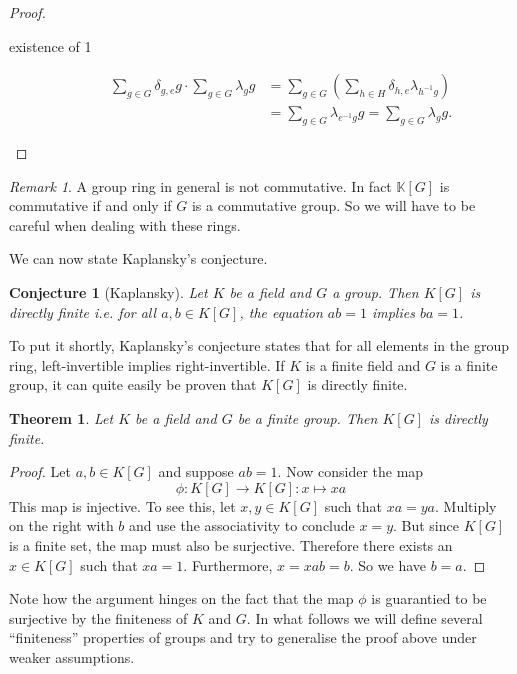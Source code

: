 \documentclass[titlepage, a4paper]{article}
\newtheorem{theorem}{Theorem}
\newtheorem{conjecture}{Conjecture}
\theoremstyle{remark}
\newtheorem{remark}{Remark}
\begin{document}
\begin{proof}
\begin{description}
    \item[existence of 1]
    \begin{align*}
    \sum_{g \in G} \delta_{g,e} g \cdot \sum_{g \in G} \lambda_g g
    &= \sum_{g \in G} \left(\sum_{h \in H} \delta_{h,e} \lambda_{h^{-1}g} \right) \\
    &= \sum_{g \in G} \lambda_{e^{-1}g} g = \sum_{g \in G} \lambda_g g.
    \end{align*}
    
    \end{description}
\end{proof}

\begin{remark}
	A group ring in general is not commutative. In fact $\mathbb{K}[G]$ is commutative if and only if $G$ is a commutative group. So we will have to be careful when dealing with these rings. 
\end{remark}
We can now state Kaplansky's conjecture.

\begin{conjecture}[Kaplansky]
    Let $K$ be a field and $G$ a group. Then $K[G]$ is directly finite i.e. for all $a, b \in K[G]$, the equation $ab=1$ implies $ba=1$.
\end{conjecture}

To put it shortly, Kaplansky's conjecture states that for all elements in the group ring, left-invertible implies right-invertible. If $K$ is a finite field and $G$ is a finite group, it can quite easily be proven that $K[G]$ is directly finite.

\begin{theorem}
    Let $K$ be a field and $G$ be a finite group. Then $K[G]$ is directly finite.
\end{theorem}
\begin{proof}
    Let $a, b \in K[G]$ and suppose $ab=1$. Now consider the map
    \[
        \phi: K[G] \to K[G]: x \mapsto x a
    \]
    This map is injective. To see this, let $x, y \in K[G]$ such that $xa=ya$. Multiply on the right with $b$ and use the associativity to conclude $x=y$.
    But since $K[G]$ is a finite set, the map must also be surjective. Therefore there exists an $x \in K[G]$ such that $x a = 1$. Furthermore, $x = xab = b$. So we have $b=a$.
\end{proof}

Note how the argument hinges on the fact that the map $\phi$ is guarantied to be surjective by the finiteness of $K$ and $G$. In what follows we will define several ``finiteness'' properties of groups and try to generalise the proof above under weaker assumptions.
\end{document}
